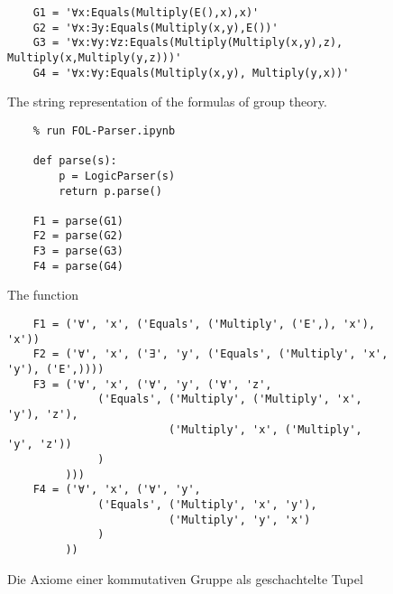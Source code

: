 \begin{figure}[!ht]
\centering
\begin{verbatim}
    G1 = '∀x:Equals(Multiply(E(),x),x)'                  
    G2 = '∀x:∃y:Equals(Multiply(x,y),E())'
    G3 = '∀x:∀y:∀z:Equals(Multiply(Multiply(x,y),z), Multiply(x,Multiply(y,z)))'
    G4 = '∀x:∀y:Equals(Multiply(x,y), Multiply(y,x))'
\end{verbatim}
\vspace*{-0.3cm}
\caption{The string representation of the formulas of group theory.}
\label{fig:group-theory}
\end{figure}

\begin{figure}[!ht]
\centering
\begin{verbatim}
    % run FOL-Parser.ipynb
               
    def parse(s):
        p = LogicParser(s)
        return p.parse()    

    F1 = parse(G1)
    F2 = parse(G2)
    F3 = parse(G3)
    F4 = parse(G4)
\end{verbatim}
\vspace*{-0.3cm}
\caption{The function  }
\label{fig:fol-parse.py}
\end{figure}

\begin{figure}[!ht]
\centering
\begin{verbatim}
    F1 = ('∀', 'x', ('Equals', ('Multiply', ('E',), 'x'), 'x'))
    F2 = ('∀', 'x', ('∃', 'y', ('Equals', ('Multiply', 'x', 'y'), ('E',))))
    F3 = ('∀', 'x', ('∀', 'y', ('∀', 'z',
              ('Equals', ('Multiply', ('Multiply', 'x', 'y'), 'z'),
                         ('Multiply', 'x', ('Multiply', 'y', 'z'))
              )
         )))
    F4 = ('∀', 'x', ('∀', 'y',
              ('Equals', ('Multiply', 'x', 'y'),
                         ('Multiply', 'y', 'x')
              )
         ))        
\end{verbatim}
\vspace*{-0.3cm}
\caption{Die Axiome einer kommutativen Gruppe als geschachtelte Tupel}
\label{fig:group-theory-tupel}
\end{figure}


